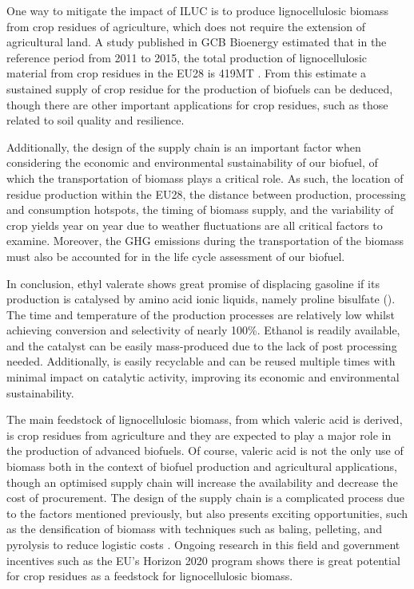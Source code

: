 \documentclass[11pt]{article}
\begin{document}
One way to mitigate the impact of ILUC is to produce lignocellulosic biomass from crop residues of agriculture, which does not require the extension of agricultural land. A study published in GCB Bioenergy estimated that in the reference period from 2011 to 2015, the total production of lignocellulosic material from crop residues in the EU28 is 419MT \cite{q7-r3}. From this estimate a sustained supply of crop residue for the production of biofuels can be deduced, though there are other important applications for crop residues, such as those related to soil quality and resilience.  

Additionally, the design of the supply chain is an important factor when considering the economic and environmental sustainability of our biofuel, of which the transportation of biomass plays a critical role. As such, the location of residue production within the EU28, the distance between production, processing and consumption hotspots, the timing of biomass supply, and the variability of crop yields year on year due to weather fluctuations are all critical factors to examine. Moreover, the GHG emissions during the transportation of the biomass must also be accounted for in the life cycle assessment of our biofuel.

In conclusion, ethyl valerate shows great promise of displacing gasoline if its production is catalysed by amino acid ionic liquids, namely proline bisulfate (). The time and temperature of the production processes are relatively low whilst achieving conversion and selectivity of nearly 100\%. Ethanol is readily available, and the catalyst can be easily mass-produced due to the lack of post processing needed. Additionally,  is easily recyclable and can be reused multiple times with minimal impact on catalytic activity, improving its economic and environmental sustainability.

The main feedstock of lignocellulosic biomass, from which valeric acid is derived, is crop residues from agriculture and they are expected to play a major role in the production of advanced biofuels. Of course, valeric acid is not the only use of biomass both in the context of biofuel production and agricultural applications, though an optimised supply chain will increase the availability and decrease the cost of procurement. The design of the supply chain is a complicated process due to the factors mentioned previously, but also presents exciting opportunities, such as the densification of biomass with techniques such as baling, pelleting, and pyrolysis to reduce logistic costs \cite{q7-r4}. Ongoing research in this field and government incentives such as the EU’s Horizon 2020 program shows there is great potential for crop residues as a feedstock for lignocellulosic biomass.
\end{document}
